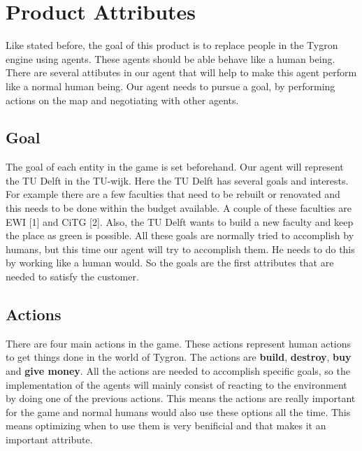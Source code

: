 \section{Product Attributes}
Like stated before, the goal of this product is to replace people in the Tygron engine using agents. These agents should be able behave like a human being. There are several attibutes in our agent that will help to make this agent perform like a normal human being. Our agent needs to pursue a goal, by performing actions on the map and negotiating with other agents.

\subsection{Goal}
The goal of each entity in the game is set beforehand. Our agent will represent the TU Delft in the TU-wijk. Here the TU Delft has several goals and interests. For example there are a few faculties that need to be rebuilt or renovated and this needs to be done within the budget available. A couple of these faculties are EWI [1] and CiTG [2]. Also, the TU Delft wants to build a new faculty and keep the place as green is possible. All these goals are normally tried to accomplish by humans, but this time our agent will try to accomplish them. He needs to do this by working like a human would. So the goals are the first attributes that are needed to satisfy the customer.

\subsection{Actions}
There are four main actions in the game. These actions represent human actions to get things done in the world of Tygron. The actions are \textbf{build}, \textbf{destroy}, \textbf{buy} and \textbf{give money}. All the actions are needed to accomplish specific goals, so the implementation of the agents will mainly consist of reacting to the environment by doing one of the previous actions. This means the actions are really important for the game and normal humans would also use these options all the time. This means optimizing when to use them is very benificial and that makes it an important attribute.

